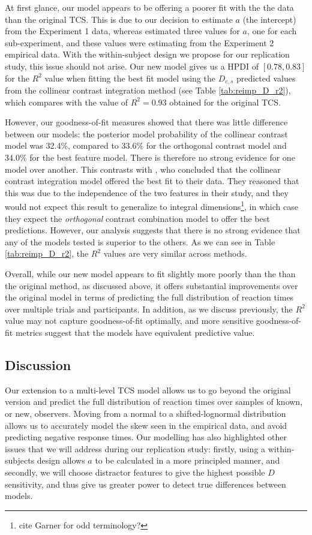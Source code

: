 \documentclass[smallextended, natbib]{svjour3}       %
\begin{document}
At first glance, our model appears to be offering a poorer fit with the the data than the original TCS. This is due to our decision to estimate $a$ (the intercept) from the Experiment 1 data, whereas \cite{buetti2019predicting} estimated three values for $a$, one for each sub-experiment, and these values were estimating from the Experiment 2 empirical data. With the within-subject design we propose for our replication study, this issue should not arise. Our new model gives us a HPDI of $[0.78, 0.83]$ for the $R^2$ value when fitting the best fit model using the $D_{c,s}$ predicted values from the collinear contrast integration method (see Table \ref{tab:reimp_D_r2}), which compares with the value of $R^2 = 0.93$ obtained for the original TCS.  

However, our goodness-of-fit measures showed that there was little difference between our models: the posterior model probability of the collinear contrast model was 32.4\%, compared to 33.6\% for the orthogonal contrast model and 34.0\% for the best feature model. There is therefore no strong evidence for one model over another. This contrasts with \cite{buetti2019predicting}, who concluded that the collinear contrast integration model offered the best fit to their data. They reasoned that this was due to the independence of the two features in their study, and they would not expect this result to generalize to integral dimensions\footnote{cite Garner for odd terminology?}, in which case they expect the \textit{orthogonal} contrast combination model to offer the best predictions. However, our analysis suggests that there is no strong evidence that any of the models tested is superior to the others. As we can see in Table \ref{tab:reimp_D_r2}, the $R^2$ values are very similar across methods. 

Overall, while our new model appears to fit slightly more poorly than the than the original method, as discussed above, it offers substantial improvements over the original model in terms of predicting the full distribution of reaction times over multiple trials and participants. In addition, as we discuss previously, the $R^2$ value may not capture goodness-of-fit optimally, and more sensitive goodness-of-fit metrics suggest that the models have equivalent predictive value.

\subsection{Discussion}

Our extension to a multi-level TCS model allows us to go beyond the original version and predict the full distribution of reaction times over samples of known, or new, observers. Moving from a normal to a shifted-lognormal distribution allows us to accurately model the skew seen in the empirical data, and avoid predicting negative response times. Our modelling has also highlighted other issues that we will address during our replication study: firstly, using a within-subjects design allows $a$ to be calculated in a more principled manner, and secondly, we will choose distractor features to give the highest possible $D$ sensitivity, and thus give us greater power to detect true differences between models.
\end{document}
